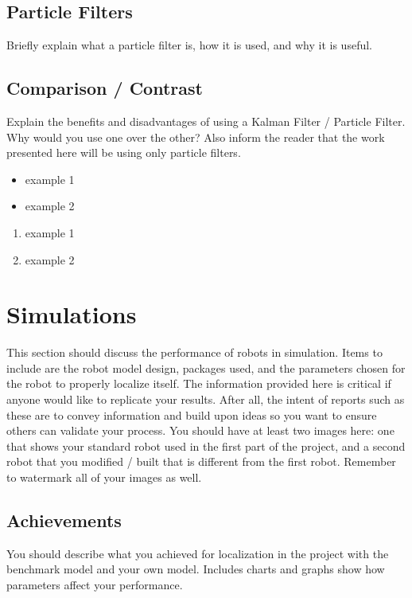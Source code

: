 \documentclass[10pt,journal,compsoc]{IEEEtran}
\begin{document}
    \subsection{Particle Filters}
    Briefly explain what a particle filter is, how it is used, and why it is useful.
    
    \subsection{Comparison / Contrast}
    Explain the benefits and disadvantages of using a Kalman Filter / Particle Filter. Why would you use one over the other? Also inform the reader that the work presented here will be using only particle filters. 
    
    \begin{itemize}
    \item example 1
    \item example 2
    \end {itemize}
    
    \begin{enumerate}
    \item example 1
    \item example 2
    \end{enumerate}
    
    \section{Simulations}
    This section should discuss the performance of robots in simulation. Items to include are the robot model design, packages used, and the parameters chosen for the robot to properly localize itself. The information provided here is critical if anyone would like to replicate your results. After all, the intent of reports such as these are to convey information and build upon ideas so you want to ensure others can validate your process.
    You should have at least two images here: one that shows your standard robot used in the first part of the project, and a second robot that you modified / built that is different from the first robot. Remember to watermark all of your images as well. 
    
    \subsection{Achievements}
    You should describe what you achieved for localization in the project with the benchmark model and your own model. Includes charts and graphs show how parameters affect your performance. 
    
\end{document}
